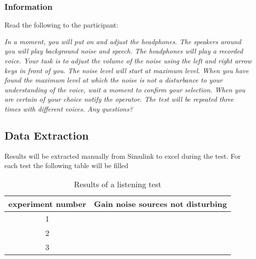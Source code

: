 \subsubsection{Information}\label{subsubsec:attenuationInformation}
Read the following to the participant:

\textit{In a moment, you will put on and adjust the headphones. The speakers around you will play background noise and speech. The headphones will play a recorded voice. Your task is to adjust the volume of the noise using the left and right arrow keys in front of you. The noise level will start at maximum level. When you have found the maximum level at which the noise is not a disturbance to your understanding of the voice, wait a moment to confirm your selection. When you are certain of your choice notify the operator. The test will be repeated three times with different voices. Any questions?}


\subsection{Data Extraction}
Results will be extracted manually from Simulink to excel during the test.
For each test the following table will be filled \\
\begin{table}[h]
\centering
	\begin{tabular}{c  c } \toprule
		experiment number & Gain noise sources not disturbing  \\ \bottomrule
		1 &   \\
		2 &   \\
		3 &   \\ \bottomrule
	\end{tabular}
	\caption{Results of a listening test}
	\label{tab:ListeningRes}
\end{table}

